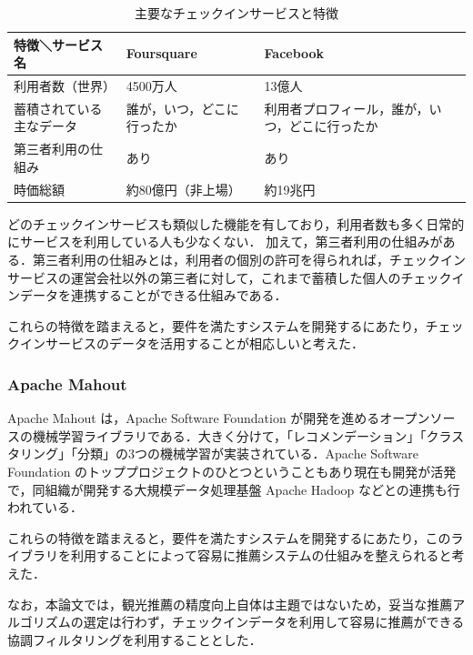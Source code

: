 \documentclass{jsarticle}
\begin{document}
\begin{table}[!h]
\small
\caption{主要なチェックインサービスと特徴}
\begin{center}
\begin{tabular}{lll}
\label{features_of_checkin_service}
特徴＼サービス名            & Foursquare                    & Facebook \\ \hline
利用者数（世界）            & 4500万人                      & 13億人 \\
蓄積されている主なデータ    & 誰が，いつ，どこに行ったか    & 利用者プロフィール，誰が，いつ，どこに行ったか \\
第三者利用の仕組み          & あり                          & あり \\
時価総額                    & 約80億円（非上場）            & 約19兆円 \\
\end{tabular}
\end{center}
\end{table}

どのチェックインサービスも類似した機能を有しており，利用者数も多く日常的にサービスを利用している人も少なくない．
加えて，第三者利用の仕組みがある．第三者利用の仕組みとは，利用者の個別の許可を得られれば，チェックインサービスの運営会社以外の第三者に対して，これまで蓄積した個人のチェックインデータを連携することができる仕組みである．

これらの特徴を踏まえると，要件を満たすシステムを開発するにあたり，チェックインサービスのデータを活用することが相応しいと考えた．

\subsubsection{Apache Mahout}

Apache Mahout は，Apache Software Foundation が開発を進めるオープンソースの機械学習ライブラリである．大きく分けて，「レコメンデーション」「クラスタリング」「分類」の3つの機械学習が実装されている．Apache Software Foundation のトッププロジェクトのひとつということもあり現在も開発が活発で，同組織が開発する大規模データ処理基盤 Apache Hadoop などとの連携も行われている．

これらの特徴を踏まえると，要件を満たすシステムを開発するにあたり，このライブラリを利用することによって容易に推薦システムの仕組みを整えられると考えた．

なお，本論文では，観光推薦の精度向上自体は主題ではないため，妥当な推薦アルゴリズムの選定は行わず，チェックインデータを利用して容易に推薦ができる協調フィルタリングを利用することとした．
\end{document}

